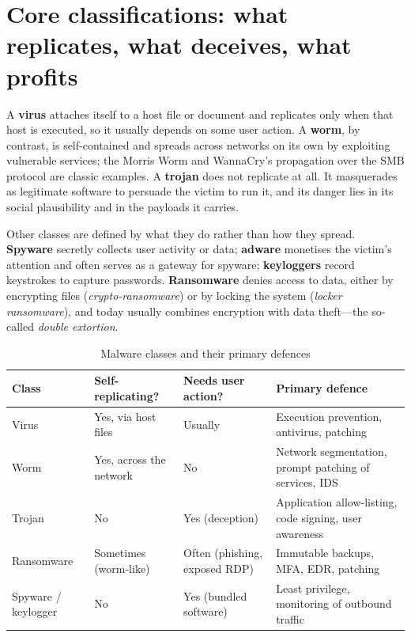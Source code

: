 \section{Core classifications: what replicates, what deceives, what profits}\label{sec:4.1}
A \textbf{virus} attaches itself to a host file or document and replicates only when that host is executed, so it usually depends on some user action. A \textbf{worm}, by contrast, is self-contained and spreads across networks on its own by exploiting vulnerable services; the Morris Worm and WannaCry's propagation over the SMB protocol are classic examples. A \textbf{trojan} does not replicate at all. It masquerades as legitimate software to persuade the victim to run it, and its danger lies in its social plausibility and in the payloads it carries.

Other classes are defined by what they do rather than how they spread. \textbf{Spyware} secretly collects user activity or data; \textbf{adware} monetises the victim's attention and often serves as a gateway for spyware; \textbf{keyloggers} record keystrokes to capture passwords. \textbf{Ransomware} denies access to data, either by encrypting files (\emph{crypto-ransomware}) or by locking the system (\emph{locker ransomware}), and today usually combines encryption with data theft—the so-called \emph{double extortion}.

\begin{table}[htbp]
  \centering\small
  \caption{Malware classes and their primary defences}
  \begin{tabularx}{\linewidth}{>{\raggedright\arraybackslash}X >{\raggedright\arraybackslash}X >{\raggedright\arraybackslash}X >{\raggedright\arraybackslash}X}
    \toprule
    \textbf{Class} & \textbf{Self-replicating?} & \textbf{Needs user action?} & \textbf{Primary defence} \\
    \midrule
    Virus & Yes, via host files & Usually & Execution prevention, antivirus, patching \\
    Worm & Yes, across the network & No & Network segmentation, prompt patching of services, IDS \\
    Trojan & No & Yes (deception) & Application allow-listing, code signing, user awareness \\
    Ransomware & Sometimes (worm-like) & Often (phishing, exposed RDP) & Immutable backups, MFA, EDR, patching \\
    Spyware / keylogger & No & Yes (bundled software) & Least privilege, monitoring of outbound traffic \\
    \bottomrule
  \end{tabularx}
\end{table}
